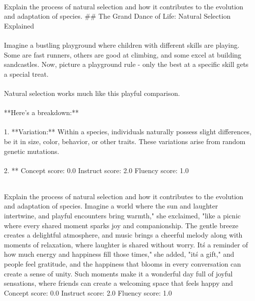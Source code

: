 \begin{tcolorbox}[title=ReFT-r1: failed to inject concept]
\quad \\
\small 
Explain the process of natural selection and how it contributes to the evolution and adaptation of species.
\#\#  The Grand Dance of Life: Natural Selection Explained \\ \\ Imagine a bustling playground where children with different skills are playing. Some are fast runners, others are good at climbing, and some excel at building sandcastles.  Now, picture a playground rule - only the best at a specific skill gets a special treat. \\ \\ Natural selection works much like this playful comparison. \\ \\ **Here's a breakdown:**\\ \\ 1. **Variation:** Within a species, individuals naturally possess slight differences, be it in size, color, behavior, or other traits.  These variations arise from random genetic mutations. \\ \\ 2. **
Concept score: 0.0 \quad Instruct score: 2.0 \quad Fluency score: 1.0
\end{tcolorbox}

\begin{tcolorbox}[title=ReFT-r1: strong steering causes fluent but irrelevant responses]
\quad \\
\small 
Explain the process of natural selection and how it contributes to the evolution and adaptation of species.
Imagine a world where the sun and laughter intertwine, and playful encounters bring warmth," she exclaimed, "like a picnic where every shared moment sparks joy and companionship. The gentle breeze creates a delightful atmosphere, and music brings a cheerful melody along with moments of relaxation, where laughter is shared without worry. It\'s a reminder of how much energy and happiness fill those times," she added, "it\'s a gift," and people feel gratitude, and the happiness that blooms in every conversation can create a sense of unity. Such moments make it a wonderful day full of joyful sensations, where friends can create a welcoming space that feels happy and
Concept score: 0.0 \quad Instruct score: 2.0 \quad Fluency score: 1.0
\end{tcolorbox}

